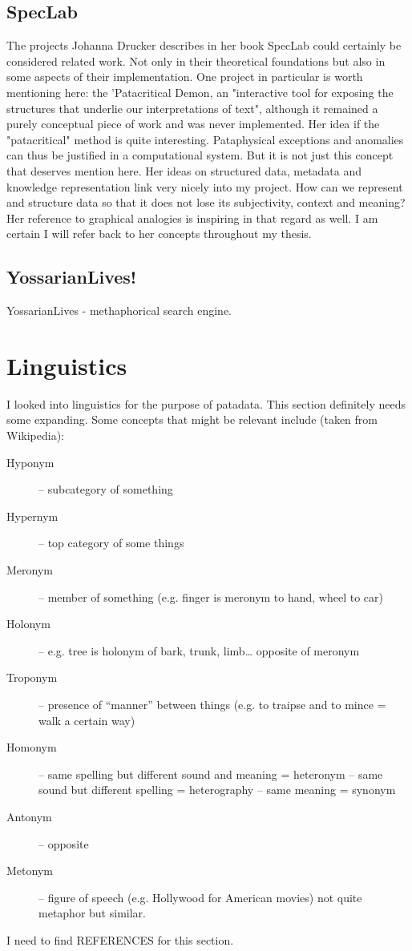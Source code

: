 \subsection{SpecLab}

The projects Johanna Drucker describes in her book SpecLab \citep{Drucker2009}  could certainly be considered related work. Not only in their theoretical foundations but also in some aspects of their implementation. One project in particular is worth mentioning here: the 'Patacritical Demon, an "interactive tool for exposing the structures that underlie our interpretations of text", although it remained a purely conceptual piece of work and was never implemented. Her idea if the "patacritical" method is quite interesting. Pataphysical exceptions and anomalies can thus be justified in a computational system. But it is not just this concept that deserves mention here.
Her ideas on structured data, metadata and knowledge representation link very nicely into my project. How can we represent and structure data so that it does not lose its subjectivity, context and meaning? Her reference to graphical analogies is inspiring in that regard as well. I am certain I will refer back to her concepts throughout my thesis.

\subsection{YossarianLives!}

YossarianLives - methaphorical search engine.

\section{Linguistics}

I looked into linguistics for the purpose of patadata. This section definitely needs some expanding. Some concepts that might be relevant include (taken from Wikipedia):

\begin{description}
\item [Hyponym] – subcategory of something
\item [Hypernym] – top category of some things
\item [Meronym] – member of something (e.g. finger is meronym to hand, wheel to car)
\item [Holonym] – e.g. tree is holonym of bark, trunk, limb… opposite of meronym
\item [Troponym] – presence of “manner” between things (e.g. to traipse and to mince = walk a certain way)
\item [Homonym] – same spelling but different sound and meaning = heteronym – same sound but different spelling = heterography – same meaning = synonym
\item [Antonym] – opposite
\item [Metonym] – figure of speech (e.g. Hollywood for American movies) not quite metaphor but similar.
\end{description}

I need to find REFERENCES for this section.
